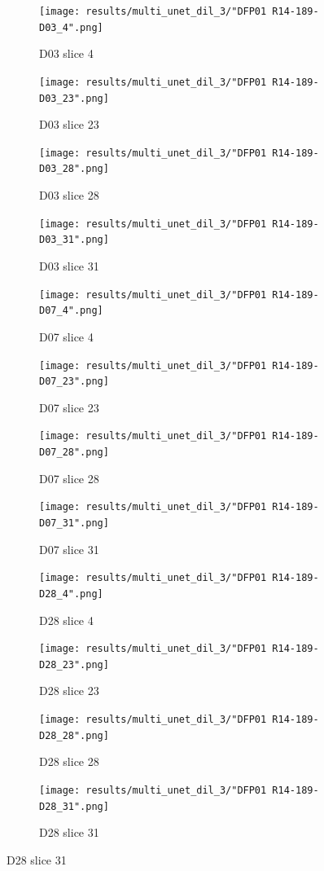 \begin{figure}[!htb]  
    \centering %
\begin{subfigure}{0.25\textwidth}
  \texttt{[image: results/multi\_unet\_dil\_3/"DFP01 R14-189-D03\_4".png]}
  \caption{D03 slice 4} 
\end{subfigure}\hfil %
\begin{subfigure}{0.25\textwidth}
  \texttt{[image: results/multi\_unet\_dil\_3/"DFP01 R14-189-D03\_23".png]}
  \caption{D03 slice 23}
\end{subfigure}\hfil %
\begin{subfigure}{0.25\textwidth}
  \texttt{[image: results/multi\_unet\_dil\_3/"DFP01 R14-189-D03\_28".png]}
  \caption{D03 slice 28}
\end{subfigure}\hfil %
\begin{subfigure}{0.25\textwidth}
  \texttt{[image: results/multi\_unet\_dil\_3/"DFP01 R14-189-D03\_31".png]}
  \caption{D03 slice 31}
\end{subfigure}


\medskip
\begin{subfigure}{0.25\textwidth}
  \texttt{[image: results/multi\_unet\_dil\_3/"DFP01 R14-189-D07\_4".png]}
  \caption{D07 slice 4}
\end{subfigure}\hfil %
\begin{subfigure}{0.25\textwidth}
  \texttt{[image: results/multi\_unet\_dil\_3/"DFP01 R14-189-D07\_23".png]}
  \caption{D07 slice 23}
\end{subfigure}\hfil %
\begin{subfigure}{0.25\textwidth}
  \texttt{[image: results/multi\_unet\_dil\_3/"DFP01 R14-189-D07\_28".png]}
  \caption{D07 slice 28}
\end{subfigure}\hfil %
\begin{subfigure}{0.25\textwidth}
  \texttt{[image: results/multi\_unet\_dil\_3/"DFP01 R14-189-D07\_31".png]}
  \caption{D07 slice 31}
\end{subfigure}


\medskip
\begin{subfigure}{0.25\textwidth}
  \texttt{[image: results/multi\_unet\_dil\_3/"DFP01 R14-189-D28\_4".png]}
  \caption{D28 slice 4}
\end{subfigure}\hfil %
\begin{subfigure}{0.25\textwidth}
  \texttt{[image: results/multi\_unet\_dil\_3/"DFP01 R14-189-D28\_23".png]}
  \caption{D28 slice 23}
\end{subfigure}\hfil %
\begin{subfigure}{0.25\textwidth}
  \texttt{[image: results/multi\_unet\_dil\_3/"DFP01 R14-189-D28\_28".png]}
  \caption{D28 slice 28}
\end{subfigure}\hfil %
\begin{subfigure}{0.25\textwidth}
  \texttt{[image: results/multi\_unet\_dil\_3/"DFP01 R14-189-D28\_31".png]}
  \caption{D28 slice 31}
\end{subfigure}
  

\end{figure}
